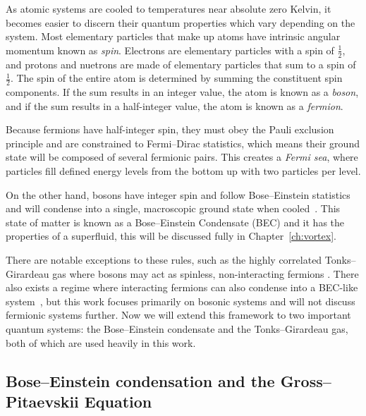 As atomic systems are cooled to temperatures near absolute zero Kelvin, it becomes easier to discern their quantum properties which vary depending on the system.
Most elementary particles that make up atoms have intrinsic angular momentum known as \textit{spin}.
Electrons are elementary particles with a spin of $\frac{1}{2}$, and protons and nuetrons are made of elementary particles that sum to a spin of $\frac{1}{2}$.
The spin of the entire atom is determined by summing the constituent spin components.
If the sum results in an integer value, the atom is known as a \textit{boson}, and if the sum results in a half-integer value, the atom is known as a \textit{fermion}.

Because fermions have half-integer spin, they must obey the Pauli exclusion principle and are constrained to Fermi--Dirac statistics, which means their ground state will be composed of several fermionic pairs.
This creates a \textit{Fermi sea}, where particles fill defined energy levels from the bottom up with two particles per level.

On the other hand, bosons have integer spin and follow Bose--Einstein statistics and will condense into a single, macroscopic ground state when cooled~\cite{Einstein1925, Fetter2003}.
This state of matter is known as a Bose--Einstein Condensate (BEC) and it has the properties of a superfluid, this will be discussed fully in Chapter~\ref{ch:vortex}.

There are notable exceptions to these rules, such as the highly correlated Tonks--Girardeau gas where bosons may act as spinless, non-interacting fermions \cite{Girardeau}.
There also exists a regime where interacting fermions can also condense into a BEC-like system~\cite{Nozieres1985, Bulgac2014}, but this work focuses primarily on bosonic systems and will not discuss fermionic systems further.
Now we will extend this framework to two important quantum systems: the Bose--Einstein condensate and the Tonks--Girardeau gas, both of which are used heavily in this work.

\subsection{Bose--Einstein condensation and the Gross--Pitaevskii Equation}

